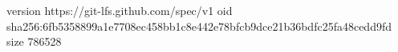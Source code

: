 version https://git-lfs.github.com/spec/v1
oid sha256:6fb5358899a1e7708ec458bb1c8e442e78bfcb9dce21b36bdfc25fa48cedd9fd
size 786528
